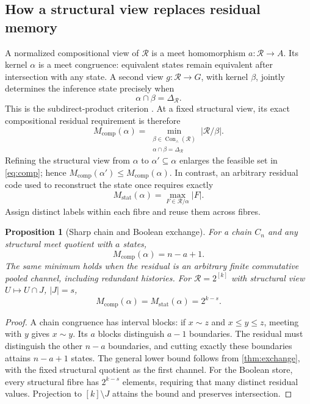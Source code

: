 \documentclass{article}
\newtheorem{proposition}[proposition]{Proposition}
\theoremstyle{definition}
\newcommand{\R}{\mathcal R}
\newcommand{\Con}{\operatorname{Con}_{\wedge}}
\newcommand{\Mcomp}{M_{\mathrm{comp}}}
\newcommand{\Mstat}{M_{\mathrm{stat}}}
\begin{document}
\subsection{How a structural view replaces residual memory}
A normalized compositional view of $\R$ is a meet homomorphism $a:\R\to A$. Its kernel $\alpha$ is a meet congruence: equivalent states remain equivalent after intersection with any state. A second view $g:\R\to G$, with kernel $\beta$, jointly determines the inference state precisely when
\begin{equation}
 \alpha\cap\beta=\Delta_\R.\label{eq:subdirect}
\end{equation}
This is the subdirect-product criterion \citep{birkhoff1944}. At a fixed structural view, its exact compositional residual requirement is therefore
\begin{equation}
 \Mcomp(\alpha)=
 \min_{\substack{\beta\in\Con(\R)\\\alpha\cap\beta=\Delta_\R}}
 |\R/\beta|.
 \label{eq:comp}
\end{equation}
Refining the structural view from $\alpha$ to $\alpha'\subseteq\alpha$ enlarges the feasible set in \eqref{eq:comp}; hence $\Mcomp(\alpha')\le\Mcomp(\alpha)$. In contrast, an arbitrary residual code used to reconstruct the state once requires exactly
\begin{equation}
 \Mstat(\alpha)=\max_{F\in\R/\alpha}|F|.\label{eq:static}
\end{equation}
Assign distinct labels within each fibre and reuse them across fibres.

\begin{proposition}[Sharp chain and Boolean exchange]\label{prop:exact}
For a chain $C_n$ and any structural meet quotient with $a$ states,
\begin{equation}
 \boxed{\Mcomp(\alpha)=n-a+1.}\label{eq:residualchain}
\end{equation}
The same minimum holds when the residual is an arbitrary finite commutative pooled channel, including redundant histories. For $\R=2^{[k]}$ with structural view $U\mapsto U\cap J$, $|J|=s$,
\begin{equation}
 \boxed{\Mcomp(\alpha)=\Mstat(\alpha)=2^{k-s}.}\label{eq:boolean}
\end{equation}
\end{proposition}
\begin{proof}
A chain congruence has interval blocks: if $x\sim z$ and $x\le y\le z$, meeting with $y$ gives $x\sim y$. Its $a$ blocks distinguish $a-1$ boundaries. The residual must distinguish the other $n-a$ boundaries, and cutting exactly these boundaries attains $n-a+1$ states. The general lower bound follows from \cref{thm:exchange}, with the fixed structural quotient as the first channel. For the Boolean store, every structural fibre has $2^{k-s}$ elements, requiring that many distinct residual values. Projection to $[k]\setminus J$ attains the bound and preserves intersection.
\end{proof}
\end{document}
